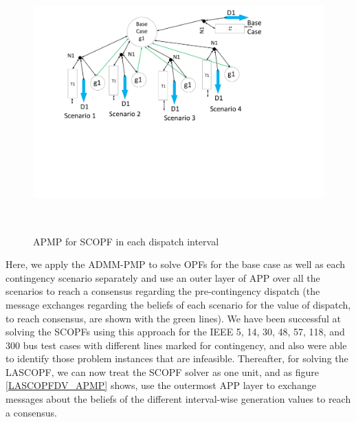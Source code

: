 \documentclass[preprint,12pt,3p]{elsarticle}
\begin{document}
	\begin{figure}
		\begin{center}
			\includegraphics[height=10cm,width=20cm]{SCOPF_Prox_Fig.pdf}
			\vspace*{-4cm}
			\caption{APMP for SCOPF in each dispatch interval}
			\label{SCOPF_APMP}
		\end{center}
	\end{figure}
	Here, we apply the ADMM-PMP to solve OPFs for the base case as well as each contingency scenario separately and use an outer layer of APP over all the scenarios to reach a consensus regarding the pre-contingency dispatch (the message exchanges regarding the beliefs of each scenario for the value of dispatch, to reach consensus, are shown with the green lines). We have been successful at solving the SCOPFs using this approach for the IEEE 5, 14, 30, 48, 57, 118, and 300 bus test cases with different lines marked for contingency, and also were able to identify those problem instances that are infeasible. Thereafter, for solving the LASCOPF, we can now treat the SCOPF solver as one unit, and as figure \ref{LASCOPFDV_APMP} shows, use the outermost APP layer to exchange messages about the beliefs of the different interval-wise generation values to reach a consensus. 
\end{document}
